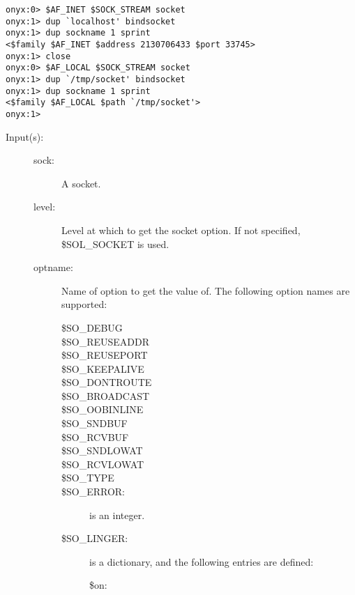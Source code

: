 \begin{description}
\begin{description}
\begin{verbatim}
onyx:0> $AF_INET $SOCK_STREAM socket
onyx:1> dup `localhost' bindsocket
onyx:1> dup sockname 1 sprint
<$family $AF_INET $address 2130706433 $port 33745>
onyx:1> close
onyx:0> $AF_LOCAL $SOCK_STREAM socket
onyx:1> dup `/tmp/socket' bindsocket
onyx:1> dup sockname 1 sprint
<$family $AF_LOCAL $path `/tmp/socket'>
onyx:1>
		\end{verbatim}
	\end{description}
\label{systemdict:sockopt}
\item[{\onyxop{sock level optname}{sockopt}{optval}}: ]
\item[{\onyxop{sock optname}{sockopt}{optval}}: ]
	\begin{description}\item[]
	\item[Input(s): ]
		\begin{description}\item[]
		\item[sock: ]
			A socket.
		\item[level: ]
			Level at which to get the socket option.  If not
			specified, \$SOL\_SOCKET is used.
		\item[optname: ]
			Name of option to get the value of.  The following
			option names are supported:
			\begin{description}%
			\item[\$SO\_DEBUG]
			\item[\$SO\_REUSEADDR]
			\item[\$SO\_REUSEPORT]
			\item[\$SO\_KEEPALIVE]
			\item[\$SO\_DONTROUTE]
			\item[\$SO\_BROADCAST]
			\item[\$SO\_OOBINLINE]
			\item[\$SO\_SNDBUF]
			\item[\$SO\_RCVBUF]
			\item[\$SO\_SNDLOWAT]
			\item[\$SO\_RCVLOWAT]
			\item[\$SO\_TYPE]
			\item[\$SO\_ERROR: ]
				 is an integer.
			\item[\$SO\_LINGER: ]
				 is a dictionary, and the
				following entries are defined:
				\begin{description}%
				\item[\$on: ]

\end{description}
\end{description}
\end{description}
\end{description}
\end{description}

